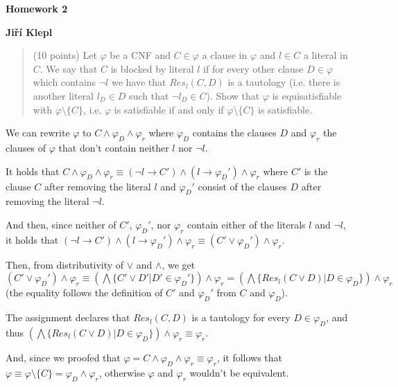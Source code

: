 \documentclass[a4paper,12pt]{article} %
\begin{document}
\begin{center}
    {\Large \bf Homework 2}
    \vspace{2mm}

    {\bf Jiří Klepl}

\end{center}

\vspace{0.4cm}

\begin{quote}
    (10 points) Let $\varphi$ be a CNF and $C \in \varphi$ a clause in $\varphi$ and $l \in C$ a literal in $C$. We say that $C$ is
blocked by literal $l$ if for every other clause $D \in \varphi$ which contains $\neg l$ we have that $Res_l(C, D)$ is a
tautology (i.e. there is another literal $l_D \in D$ such that $\neg l_D \in C$). Show that $\varphi$ is equisatisfiable with
$\varphi \setminus \{C\}$, i.e. $\varphi$ is satisfiable if and only if $\varphi \setminus \{C\}$ is satisfiable.
\end{quote}

We can rewrite $\varphi$ to $C \wedge \varphi_D \wedge \varphi_r$ where $\varphi_D$ contains the clauses $D$ and $\varphi_r$ the clauses of $\varphi$ that don't contain neither $l$ nor $\neg l$.


It holds that $C \wedge \varphi_D \wedge \varphi_r \equiv (\neg l \to C') \wedge (l \to \varphi_D') \wedge \varphi_r$ where $C'$ is the clause $C$ after removing the literal $l$ and $\varphi_D'$ consist of the clauses $D$ after removing the literal $\neg l$.

And then, since neither of $C'$, $\varphi_D'$, nor $\varphi_r$ contain either of the literals $l$ and $\neg l$, it holds that $(\neg l \to C') \wedge (l \to \varphi_D') \wedge \varphi_r \equiv (C' \vee \varphi_D') \wedge \varphi_r$.

Then, from distributivity of $\vee$ and $\wedge$, we get $(C' \vee \varphi_D') \wedge \varphi_r \equiv (\bigwedge \{C' \vee D' | D' \in \varphi_D'\}) \wedge \varphi_r = (\bigwedge \{Res_l(C \vee D) | D \in \varphi_D\}) \wedge \varphi_r$ (the equality follows the definition of $C'$ and $\varphi_D'$ from $C$ and $\varphi_D$).

The assignment declares that $Res_l(C, D)$ is a tautology for every $D \in \varphi_D$, and thus $(\bigwedge \{Res_l(C \vee D) | D \in \varphi_D\}) \wedge \varphi_r \equiv \varphi_r$.

And, since we proofed that $\varphi = C \wedge \varphi_D \wedge \varphi_r \equiv \varphi_r$, it follows that $\varphi \equiv \varphi \setminus \{C\} = \varphi_D \wedge \varphi_r$, otherwise $\varphi$ and $\varphi_r$ wouldn't be equivalent.
\end{document}
